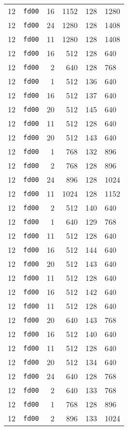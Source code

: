 \documentclass{article}
\begin{document}
\begin{table}[h!]
\begin{tabular}{llrrrl}
    12 & \texttt{fd00} & 16 & 1152 & 128 & 1280 \\
    12 & \texttt{fd00} & 24 & 1280 & 128 & 1408 \\
    12 & \texttt{fd00} & 11 & 1280 & 128 & 1408 \\
    12 & \texttt{fd00} & 16 & 512 & 128 & 640 \\
    12 & \texttt{fd00} & 2 & 640 & 128 & 768 \\
    12 & \texttt{fd00} & 1 & 512 & 136 & 640 \\
    12 & \texttt{fd00} & 16 & 512 & 137 & 640 \\
    12 & \texttt{fd00} & 20 & 512 & 145 & 640 \\
    12 & \texttt{fd00} & 11 & 512 & 128 & 640 \\
    12 & \texttt{fd00} & 20 & 512 & 143 & 640 \\
    12 & \texttt{fd00} & 1 & 768 & 132 & 896 \\
    12 & \texttt{fd00} & 2 & 768 & 128 & 896 \\
    12 & \texttt{fd00} & 24 & 896 & 128 & 1024 \\
    12 & \texttt{fd00} & 11 & 1024 & 128 & 1152 \\
    12 & \texttt{fd00} & 2 & 512 & 140 & 640 \\
    12 & \texttt{fd00} & 1 & 640 & 129 & 768 \\
    12 & \texttt{fd00} & 11 & 512 & 128 & 640 \\
    12 & \texttt{fd00} & 16 & 512 & 144 & 640 \\
    12 & \texttt{fd00} & 20 & 512 & 143 & 640 \\
    12 & \texttt{fd00} & 11 & 512 & 128 & 640 \\
    12 & \texttt{fd00} & 16 & 512 & 142 & 640 \\
    12 & \texttt{fd00} & 11 & 512 & 128 & 640 \\
    12 & \texttt{fd00} & 20 & 640 & 143 & 768 \\
    12 & \texttt{fd00} & 16 & 512 & 140 & 640 \\
    12 & \texttt{fd00} & 11 & 512 & 128 & 640 \\
    12 & \texttt{fd00} & 20 & 512 & 134 & 640 \\
    12 & \texttt{fd00} & 24 & 640 & 128 & 768 \\
    12 & \texttt{fd00} & 2 & 640 & 133 & 768 \\
    12 & \texttt{fd00} & 1 & 768 & 128 & 896 \\
    12 & \texttt{fd00} & 2 & 896 & 133 & 1024 \\

\end{tabular}
\end{table}
\end{document}
